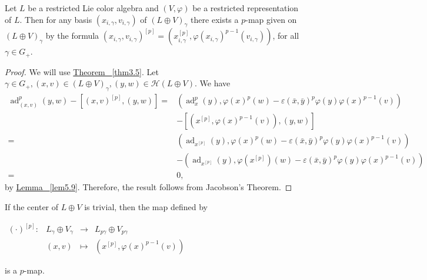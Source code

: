 \documentclass[11pt, twoside]{article}
\DeclareMathOperator{\ad}{ad}
\begin{document}
\begin{prop}
    Let $L$ be a restricted Lie color algebra and $(V,\varphi)$ be a restricted representation of $L$. Then for any basis $(x_{i,\gamma},v_{i,\gamma})$ of $(L\oplus V)_\gamma$ there exists a $p$-map given on $(L\oplus V)_\gamma$ by the formula $(x_{i,\gamma},v_{i,\gamma})^{[p]}= (x_{i,\gamma}^{[p]}, \varphi(x_{i,\gamma})^{p-1}(v_{i,\gamma})) $,  for all $\gamma\in G_+ $.
\end{prop}

\begin{proof}
    We will use  \hyperref[thm3.5]{Theorem ~\ref*{thm3.5}}. Let $\gamma\in G_+, (x,v)\in (L\oplus V)_\gamma, (y,w)\in \mathcal{H}(L\oplus V) $. We have \begin{align*}
        \ad_{(x,v)}^p(y,w)-[(x,v)^{[p]}, (y,w)] =& (\ad_x^p(y), \varphi(x)^p(w) - \varepsilon(\bar{x},\bar{y})^p\varphi(y)\varphi(x)^{p-1}(v)) \\ & -[(x^{[p]},\varphi(x)^{p-1}(v)), (y,w)]\\  =& (\ad_{x^{[p]}}(y),  \varphi(x)^p(w) - \varepsilon(\bar{x},\bar{y})^p\varphi(y)\varphi(x)^{p-1}(v))\\ & - (\ad_{x^{[p]}}(y),  \varphi(x^{[p]})(w) - \varepsilon(\bar{x},\bar{y})^p\varphi(y)\varphi(x)^{p-1}(v)) \\ = & 0,
    \end{align*} by \hyperref[lem5.9]{Lemma ~\ref*{lem5.9}}. Therefore, the result follows from Jacobson's Theorem.
\end{proof}

\begin{rmq}
    If the center of $L\oplus V $ is trivial, then the map defined by \begin{center}
    $\begin{array}{lrcl}
(\cdot)^{[p]} : & L_\gamma\oplus V_\gamma & \longrightarrow & L_{p\gamma}\oplus V_{p\gamma} \\
    & (x,v) & \longmapsto & (x^{[p]},\varphi(x)^{p-1}(v))\end{array}$ \end{center} is a $p$-map.
\end{rmq}
\end{document}
